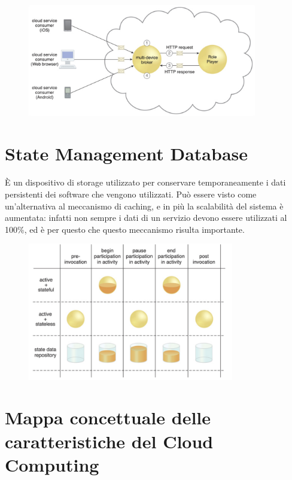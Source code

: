 \begin{figure}[ht]
    \centering
    \includegraphics[width=10cm]{./Images/cap9/9.3.png}
\end{figure}

\section{State Management Database}
È un dispositivo di storage utilizzato per conservare temporaneamente i dati persistenti dei software che vengono utilizzati. Può essere visto come un'alternativa al meccanismo di caching, e in più la scalabilità del sistema è aumentata: infatti non sempre i dati di un servizio devono essere utilizzati al 100\%, ed è per questo che questo meccanismo risulta importante.

\begin{figure}[ht]
    \centering
    \includegraphics[width=9cm]{./Images/cap9/9.4.png}
\end{figure}



\section{Mappa concettuale delle caratteristiche del Cloud Computing}

